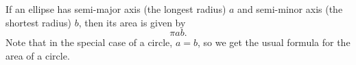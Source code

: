 If an ellipse has semi-major axis (the longest radius) $a$ and semi-minor axis
(the shortest radius) $b$, then its area is given by 
\[ \pi ab. \]
Note that in the special case of a circle, $a=b$, so we get the usual formula
for the area of a circle.